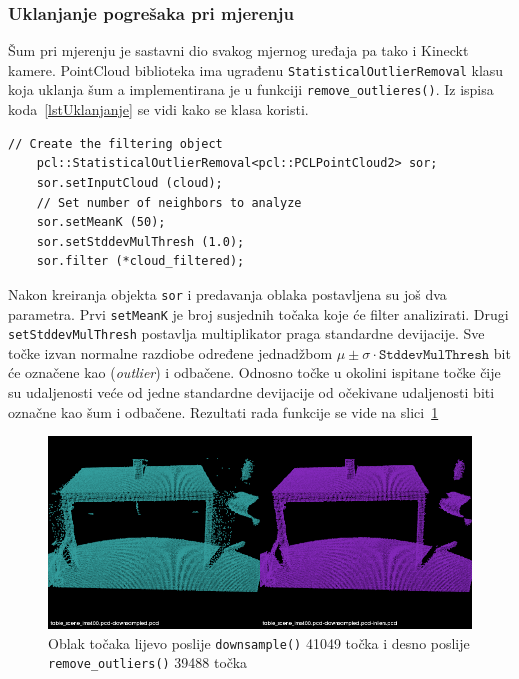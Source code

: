 

\subsubsection{Uklanjanje pogrešaka pri mjerenju} %
\label{ssub:Uklanjanje pogrešaka pri mjerenju}
Šum pri mjerenju je sastavni dio svakog mjernog uređaja pa tako i
Kineckt kamere. PointCloud biblioteka ima ugrađenu
\texttt{StatisticalOutlierRemoval} klasu koja uklanja šum a 
implementirana je u funkciji \texttt{remove\_outlieres()}.
Iz ispisa koda~\ref{lstUklanjanje} se vidi kako se klasa koristi.

\begin{lstlisting}[label=lstUklanjanje, caption={Dio izvornog koda 
iz funkcije \texttt{remove\_outliers()} }]
    // Create the filtering object
    pcl::StatisticalOutlierRemoval<pcl::PCLPointCloud2> sor;
    sor.setInputCloud (cloud);
    // Set number of neighbors to analyze
    sor.setMeanK (50);
    sor.setStddevMulThresh (1.0);
    sor.filter (*cloud_filtered);
\end{lstlisting}

Nakon kreiranja objekta \texttt{sor} i predavanja oblaka postavljena su
još dva parametra. Prvi \texttt{setMeanK} je broj susjednih točaka koje
će filter analizirati. Drugi \texttt{setStddevMulThresh} postavlja
multiplikator praga standardne devijacije. Sve točke izvan normalne
razdiobe određene jednadžbom \(\mu\pm\sigma\cdot\texttt{StddevMulThresh}\)
bit će označene kao (\textit{outlier}) i odbačene.  Odnosno točke u
okolini ispitane točke čije su udaljenosti veće od jedne standardne
devijacije od očekivane udaljenosti biti označne kao šum i odbačene.
Rezultati rada funkcije se vide na
slici~\ref{fig:tablescene-outliers}

\begin{figure}[h]
\centering
\includegraphics[scale=0.5]{figures/tablescene-remove-outliers-example.png}
\caption{Oblak točaka lijevo poslije \texttt{downsample()} 41049 točka i desno poslije
\texttt{remove\_outliers()} 39488 točka }
\label{fig:tablescene-outliers}
\end{figure}


